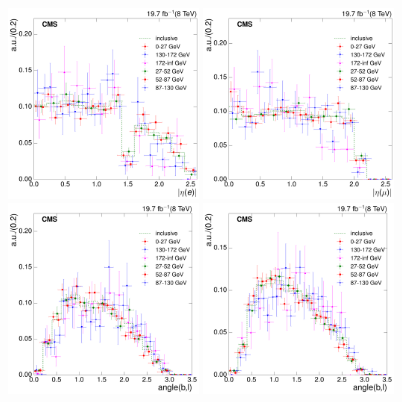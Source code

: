 \begin{figure}[hbtp]
    \centering
     \includegraphics[width=0.45\textwidth]{Chapters/04_Analysis/04b_XSections/images/8TeV/fit_variables/electron/MET/electron_absolute_eta/vjets/MET_electron_absolute_eta_2orMoreBtags_VJets_template_comparison.pdf}\hfill
     \includegraphics[width=0.45\textwidth]{Chapters/04_Analysis/04b_XSections/images/8TeV/fit_variables/muon/MET/muon_absolute_eta/vjets/MET_muon_absolute_eta_2orMoreBtags_VJets_template_comparison.pdf}\\
     \includegraphics[width=0.45\textwidth]{Chapters/04_Analysis/04b_XSections/images/8TeV/fit_variables/electron/MET/angle_bl/vjets/MET_angle_bl_2orMoreBtags_VJets_template_comparison.pdf}\hfill
     \includegraphics[width=0.45\textwidth]{Chapters/04_Analysis/04b_XSections/images/8TeV/fit_variables/muon/MET/angle_bl/vjets/MET_angle_bl_2orMoreBtags_VJets_template_comparison.pdf}\\

\end{figure}
